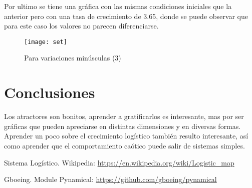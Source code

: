 \documentclass[12pt,letterpaper]{article}
\begin{document}
Por ultimo se tiene una gráfica con las mismas condiciones iniciales que la anterior pero con una tasa de crecimiento de 3.65, donde se puede observar que para este caso los valores no parecen diferenciarse.

\begin{figure}[H]
	\centering
	\texttt{[image: set]}
	\caption{Para variaciones minúsculas (3)}
\end{figure}

\section{Conclusiones} 

Los atractores son bonitos, aprender a gratificarlos es interesante, mas por ser gráficas que pueden apreciarse en distintas dimensiones y en diversas formas.\\
Aprender un poco sobre el crecimiento logístico también resulto interesante, así como aprender que el comportamiento caótico puede salir de sistemas simples.


\begin{thebibliography}{2}

 Sistema Logístico. Wikipedia: \url{https://en.wikipedia.org/wiki/Logistic_map}

 Gboeing. Module Pynamical: \url{https://github.com/gboeing/pynamical}
\end{thebibliography}
\end{document}
